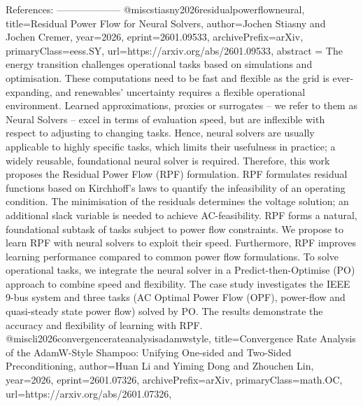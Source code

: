         References:
        --------------------
        @misc{stiasny2026residualpowerflowneural,
      title={Residual Power Flow for Neural Solvers}, 
      author={Jochen Stiasny and Jochen Cremer},
      year={2026},
      eprint={2601.09533},
      archivePrefix={arXiv},
      primaryClass={eess.SY},
      url={https://arxiv.org/abs/2601.09533},
      abstract = {The energy transition challenges operational tasks based on simulations and optimisation. These computations need to be fast and flexible as the grid is ever-expanding, and renewables' uncertainty requires a flexible operational environment. Learned approximations, proxies or surrogates -- we refer to them as Neural Solvers -- excel in terms of evaluation speed, but are inflexible with respect to adjusting to changing tasks. Hence, neural solvers are usually applicable to highly specific tasks, which limits their usefulness in practice; a widely reusable, foundational neural solver is required. Therefore, this work proposes the Residual Power Flow (RPF) formulation. RPF formulates residual functions based on Kirchhoff's laws to quantify the infeasibility of an operating condition. The minimisation of the residuals determines the voltage solution; an additional slack variable is needed to achieve AC-feasibility. RPF forms a natural, foundational subtask of tasks subject to power flow constraints. We propose to learn RPF with neural solvers to exploit their speed. Furthermore, RPF improves learning performance compared to common power flow formulations. To solve operational tasks, we integrate the neural solver in a Predict-then-Optimise (PO) approach to combine speed and flexibility. The case study investigates the IEEE 9-bus system and three tasks (AC Optimal Power Flow (OPF), power-flow and quasi-steady state power flow) solved by PO. The results demonstrate the accuracy and flexibility of learning with RPF.}
}@misc{li2026convergencerateanalysisadamwstyle,
      title={Convergence Rate Analysis of the AdamW-Style Shampoo: Unifying One-sided and Two-Sided Preconditioning}, 
      author={Huan Li and Yiming Dong and Zhouchen Lin},
      year={2026},
      eprint={2601.07326},
      archivePrefix={arXiv},
      primaryClass={math.OC},
      url={https://arxiv.org/abs/2601.07326},
}
